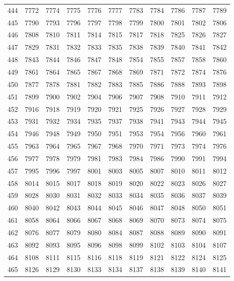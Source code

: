 \begin{longtable}{|r|rrrrrrrrrr|}
  444 & 7772 & 7774 & 7775 & 7776 & 7777 & 7783 & 7784 & 7786 & 7787 & 7789 \\ 
  445 & 7790 & 7793 & 7796 & 7797 & 7798 & 7799 & 7800 & 7801 & 7802 & 7806 \\ 
  446 & 7808 & 7810 & 7811 & 7814 & 7815 & 7817 & 7818 & 7825 & 7826 & 7827 \\ 
  447 & 7829 & 7831 & 7832 & 7833 & 7835 & 7838 & 7839 & 7840 & 7841 & 7842 \\ 
  448 & 7843 & 7844 & 7846 & 7847 & 7848 & 7854 & 7855 & 7857 & 7858 & 7860 \\ 
  449 & 7861 & 7864 & 7865 & 7867 & 7868 & 7869 & 7871 & 7872 & 7874 & 7876 \\ 
  450 & 7877 & 7878 & 7881 & 7882 & 7883 & 7885 & 7886 & 7888 & 7893 & 7898 \\ 
  451 & 7899 & 7900 & 7902 & 7904 & 7906 & 7907 & 7908 & 7910 & 7911 & 7912 \\ 
  452 & 7916 & 7918 & 7919 & 7920 & 7921 & 7925 & 7926 & 7927 & 7928 & 7929 \\ 
  453 & 7931 & 7932 & 7934 & 7935 & 7937 & 7938 & 7941 & 7943 & 7944 & 7945 \\ 
  454 & 7946 & 7948 & 7949 & 7950 & 7951 & 7953 & 7954 & 7956 & 7960 & 7961 \\ 
  455 & 7963 & 7964 & 7965 & 7967 & 7968 & 7970 & 7971 & 7973 & 7974 & 7976 \\ 
  456 & 7977 & 7978 & 7979 & 7981 & 7983 & 7984 & 7986 & 7990 & 7991 & 7994 \\ 
  457 & 7995 & 7996 & 7997 & 8001 & 8003 & 8005 & 8007 & 8010 & 8011 & 8012 \\ 
  458 & 8014 & 8015 & 8017 & 8018 & 8019 & 8020 & 8022 & 8023 & 8026 & 8027 \\ 
  459 & 8028 & 8030 & 8031 & 8032 & 8033 & 8034 & 8035 & 8036 & 8037 & 8039 \\ 
  460 & 8040 & 8042 & 8043 & 8044 & 8045 & 8046 & 8047 & 8048 & 8050 & 8051 \\ 
  461 & 8058 & 8064 & 8066 & 8067 & 8068 & 8069 & 8070 & 8073 & 8074 & 8075 \\ 
  462 & 8076 & 8077 & 8079 & 8080 & 8084 & 8087 & 8088 & 8089 & 8090 & 8091 \\ 
  463 & 8092 & 8093 & 8095 & 8096 & 8098 & 8099 & 8102 & 8103 & 8104 & 8107 \\ 
  464 & 8108 & 8111 & 8115 & 8116 & 8118 & 8119 & 8121 & 8122 & 8124 & 8125 \\ 
  465 & 8126 & 8129 & 8130 & 8133 & 8134 & 8137 & 8138 & 8139 & 8140 & 8141 \\ 

\end{longtable}
